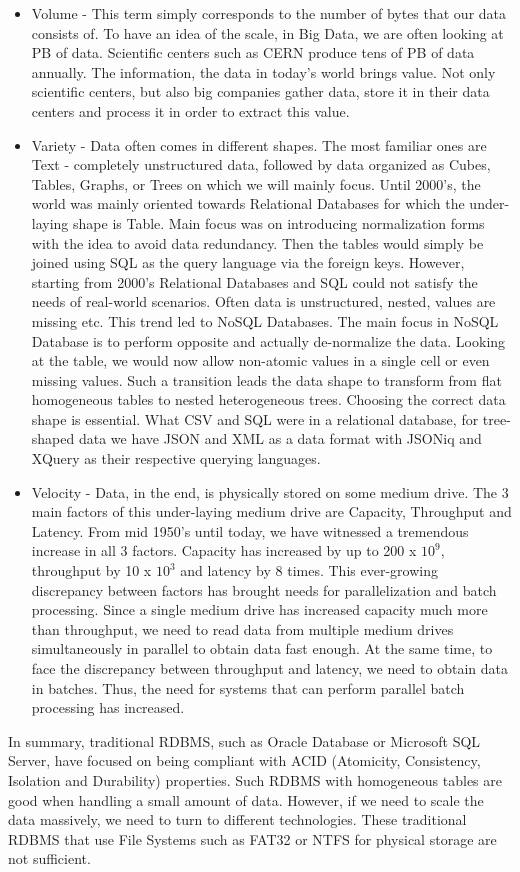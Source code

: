 \begin{itemize}
	\item Volume - This term simply corresponds to the number of bytes that our data consists of. To have an idea of the scale, in Big Data, we are often looking at PB of data. Scientific centers such as CERN produce tens of PB of data annually. The information, the data in today's world brings value. Not only scientific centers, but also big companies gather data, store it in their data centers and process it in order to extract this value.
	\item Variety - Data often comes in different shapes. The most familiar ones are Text - completely unstructured data, followed by data organized as Cubes, Tables, Graphs, or Trees on which we will mainly focus. Until 2000's, the world was mainly oriented towards Relational Databases for which the under-laying shape is Table. Main focus was on introducing normalization forms with the idea to avoid data redundancy. Then the tables would simply be joined using SQL as the query language via the foreign keys. However, starting from 2000's Relational Databases and SQL could not satisfy the needs of real-world scenarios. Often data is unstructured, nested, values are missing etc. This trend led to NoSQL Databases. The main focus in NoSQL Database is to perform opposite and actually de-normalize the data. Looking at the table, we would now allow non-atomic values in a single cell or even missing values. Such a transition leads the data shape to transform from flat homogeneous tables to nested heterogeneous trees. Choosing the correct data shape is essential. What CSV and SQL were in a relational database, for tree-shaped data we have JSON and XML as a data format with JSONiq and XQuery as their respective querying languages.
	\item Velocity - Data, in the end, is physically stored on some medium drive. The 3 main factors of this under-laying medium drive are Capacity, Throughput and Latency. From mid 1950's until today, we have witnessed a tremendous increase in all 3 factors. Capacity has increased by up to 200 x $10^9$, throughput by 10 x $10^3$  and latency by 8 times. This ever-growing discrepancy between factors has brought needs for parallelization and batch processing. Since a single medium drive has increased capacity much more than throughput, we need to read data from multiple medium drives simultaneously in parallel to obtain data fast enough. At the same time, to face the discrepancy between throughput and latency, we need to obtain data in batches. Thus, the need for systems that can perform parallel batch processing has increased. 
\end{itemize}
In summary, traditional RDBMS, such as Oracle Database or Microsoft SQL Server, have focused on being compliant with ACID (Atomicity, Consistency, Isolation and Durability) properties. Such RDBMS with homogeneous tables are good when handling a small amount of data. However, if we need to scale the data massively, we need to turn to different technologies. These traditional RDBMS that use File Systems such as FAT32 or NTFS for physical storage are not sufficient. 

